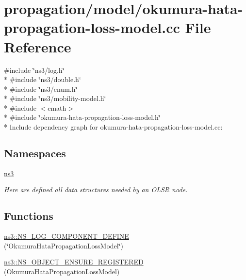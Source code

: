 \hypertarget{okumura-hata-propagation-loss-model_8cc}{}\section{propagation/model/okumura-\/hata-\/propagation-\/loss-\/model.cc File Reference}
\label{okumura-hata-propagation-loss-model_8cc}
{\ttfamily \#include \char`\"{}ns3/log.\+h\char`\"{}}\\*
{\ttfamily \#include \char`\"{}ns3/double.\+h\char`\"{}}\\*
{\ttfamily \#include \char`\"{}ns3/enum.\+h\char`\"{}}\\*
{\ttfamily \#include \char`\"{}ns3/mobility-\/model.\+h\char`\"{}}\\*
{\ttfamily \#include $<$cmath$>$}\\*
{\ttfamily \#include \char`\"{}okumura-\/hata-\/propagation-\/loss-\/model.\+h\char`\"{}}\\*
Include dependency graph for okumura-\/hata-\/propagation-\/loss-\/model.cc\+:
\subsection*{Namespaces}
\begin{DoxyCompactItemize}
\item 
 \hyperlink{namespacens3}{ns3}
\begin{DoxyCompactList}\small\item\em Here are defined all data structures needed by an O\+L\+SR node. \end{DoxyCompactList}\end{DoxyCompactItemize}
\subsection*{Functions}
\begin{DoxyCompactItemize}
\item 
\hyperlink{namespacens3_aa56e28c03170223492431ecdcf035429}{ns3\+::\+N\+S\+\_\+\+L\+O\+G\+\_\+\+C\+O\+M\+P\+O\+N\+E\+N\+T\+\_\+\+D\+E\+F\+I\+NE} (\char`\"{}Okumura\+Hata\+Propagation\+Loss\+Model\char`\"{})
\item 
\hyperlink{namespacens3_ae0c60836bd92573ac8c03d8af7a227cd}{ns3\+::\+N\+S\+\_\+\+O\+B\+J\+E\+C\+T\+\_\+\+E\+N\+S\+U\+R\+E\+\_\+\+R\+E\+G\+I\+S\+T\+E\+R\+ED} (Okumura\+Hata\+Propagation\+Loss\+Model)
\end{DoxyCompactItemize}
